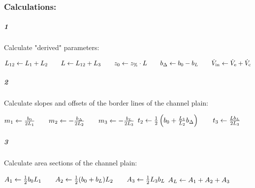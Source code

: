 \subsubsection*{Calculations:}
\subparagraph{1}
Calculate "derived" parameters:
\begin{algorithmic}
\State $L_{12} \leftarrow L_1 + L_2
        \qquad L \leftarrow L_{12} + L_3
        \qquad z_0 \leftarrow z_\text{\%} \cdot L
        \qquad b_\Delta \leftarrow  b_0 - b_L
        \qquad \dot{V}_\text{in} \leftarrow \dot{V}_\text{e} + \dot{V}_\text{c}
        $
\end{algorithmic}
\subparagraph{2}
Calculate slopes and offsets of the border lines of the channel plain:
\begin{algorithmic}
  \State $       m_1 \leftarrow   \frac{b_0}{2L_1}
          \qquad m_2 \leftarrow - \frac{b_\Delta}{2L_2}
          \qquad m_3 \leftarrow - \frac{b_L}{2L_3}
         $\vspace*{.5ex}
  \State $           t_2 \leftarrow \frac{1}{2} \left( b_0 +  \frac{L_1}{L_2}b_\Delta \right)
              \qquad t_3 \leftarrow \frac{L b_L}{2 L_3 }
         $\vspace*{.5ex}
\end{algorithmic}
\subparagraph{3}
Calculate area sections of the channel plain:
\begin{algorithmic}
  \State $       A_1 \leftarrow \frac{1}{2} b_0  L_1  
          \qquad A_2 \leftarrow  \frac{1}{2} (b_0 + b_L) L_2  
          \qquad A_3 \leftarrow \frac{1}{2} L_3b_L  
         $\vspace*{.5ex}
  \State $  A_L \leftarrow A_1 + A_2 + A_3
  $\vspace*{.5ex}
\end{algorithmic}

